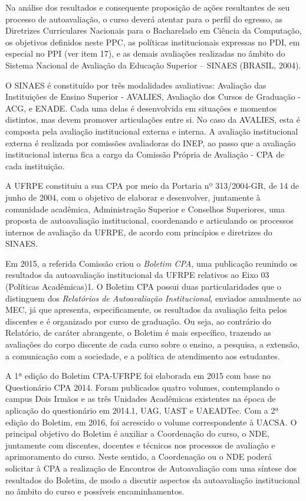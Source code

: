 Na análise dos resultados e consequente proposição de ações resultantes de seu processo de autoavaliação, o curso deverá atentar para o perfil do egresso, as Diretrizes Curriculares Nacionais para o Bacharelado em Ciência da Computação, os objetivos definidos neste PPC, as políticas institucionais expressas no PDI, em especial no PPI (ver item 17), e as demais avaliações realizadas no âmbito do Sistema Nacional de Avaliação da Educação Superior – SINAES (BRASIL, 2004).

O SINAES é constituído por três modalidades avaliativas: Avaliação das Instituições de Ensino Superior - AVALIES, Avaliação dos Cursos de Graduação - ACG, e ENADE. Cada uma delas é desenvolvida em situações e momentos distintos, mas devem promover articulações entre si. No caso da AVALIES, esta é composta pela avaliação institucional externa e interna. A avaliação institucional externa é realizada por comissões avaliadoras do INEP, ao passo que a avaliação institucional interna fica a cargo da Comissão Própria de Avaliação - CPA de cada instituição.

A UFRPE constituiu a sua CPA por meio da Portaria nº 313/2004-GR, de 14 de junho de 2004, com o objetivo de elaborar e desenvolver, juntamente à comunidade acadêmica, Administração Superior e Conselhos Superiores, uma proposta de autoavaliação institucional, coordenando e articulando os processos internos de avaliação da UFRPE, de acordo com princípios e diretrizes do SINAES.

Em 2015, a referida Comissão criou o \textit{Boletim CPA}, uma publicação reunindo os resultados da autoavaliação institucional da UFRPE relativos ao Eixo 03 (Políticas Acadêmicas)1. O Boletim CPA possui duas particularidades que o distinguem dos \textit{Relatórios de Autoavaliação Institucional}, enviados anualmente ao MEC, já que apresenta, especificamente, os resultados da avaliação feita pelos discentes e é organizado por curso de graduação. Ou seja, ao contrário do Relatório, de caráter abrangente, o Boletim é mais específico, trazendo as avaliações do corpo discente de cada curso sobre o ensino, a pesquisa, a extensão, a comunicação com a sociedade, e a política de atendimento aos estudantes.

A 1ª edição do Boletim CPA-UFRPE foi elaborada em 2015 com base no Questionário CPA 2014. Foram publicados quatro volumes, contemplando o campus Dois Irmãos e as três Unidades Acadêmicas existentes na época de aplicação do questionário em 2014.1, UAG, UAST e UAEADTec. Com a 2ª edição do Boletim, em 2016, foi acrescido o volume correspondente à UACSA. O principal objetivo do Boletim é auxiliar a Coordenação do curso, o NDE, juntamente com discentes, docentes e técnicos nos processos de avaliação e aprimoramento do curso. Neste sentido, a Coordenação ou o NDE poderá solicitar à CPA a realização de Encontros de Autoavaliação com uma síntese dos resultados do Boletim, de modo a discutir aspectos da autoavaliação institucional no âmbito do curso e possíveis encaminhamentos.
